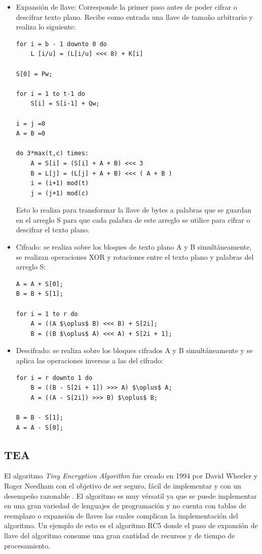 \begin{itemize}
\item Expansión de llave: Corresponde la primer paso antes de poder cifrar o descifrar texto plano. Recibe como entrada una llave de tamaño arbitrario y realiza lo siguiente:
\begin{lstlisting}[caption=Pseudo-código del paso de expansión de llave en el algoritmo RC5 \citep{rivest}., label=lstKeyExpansionRC5, mathescape]
for i = b - 1 downto 0 do
	L [i/u] = (L[i/u] <<< 8) + K[i]
	
S[0] = Pw;

for i = 1 to t-1 do
	S[i] = S[i-1] + Qw;
	
i = j =0
A = B =0

do 3*max(t,c) times:
	A = S[i] = (S[i] + A + B) <<< 3
	B = L[j] = (L[j] + A + B) <<< ( A + B )
	i = (i+1) mod(t)
	j = (j+1) mod(c)
\end{lstlisting}
Esto lo realiza para transformar la llave de bytes a palabras que se guardan en el arreglo S para que cada palabra de este arreglo se utilice para cifrar o descifrar el texto plano.

\item Cifrado: se realiza sobre los bloques de texto plano A y B simultáneamente, se realizan operaciones XOR y rotaciones entre el texto plano y palabras del arreglo S:
\begin{lstlisting}[caption=Pseudo-código del paso de cifrado en el algoritmo RC5 \citep{rivest}., label=lstCipherRC5, mathescape]
A = A + S[0];
B = B + S[1];

for i = 1 to r do
	A = ((A $\oplus$ B) <<< B) + S[2i];
	B = ((B $\oplus$ A) <<< A) + S[2i + 1];
\end{lstlisting}


\item Descifrado: se realiza sobre los bloques cifrados A y B simultáneamente y se aplica las operaciones inversas a las del cifrado:
\begin{lstlisting}[caption=Pseudo-código del paso de descifrado en el algoritmo RC5 \citep{rivest}., label={lstDecipherRC5}, mathescape]
for i = r downto 1 do
	B = ((B - S[2i + 1]) >>> A) $\oplus$ A;
	A = ((A - S[2i]) >>> B) $\oplus$ B;
	
B = B - S[1];
A = A - S[0];
\end{lstlisting}
\end{itemize}




\subsection{TEA}
El algoritmo \textit{Tiny Encryption Algorithm} fue creado en 1994 por David Wheeler y Roger Needham con el objetivo de ser seguro, fácil de implementar y con un desempeño razonable \citep{tea}. El algoritmo es muy vérsatil ya que se puede implementar en una gran variedad de lenguajes de programación y no cuenta con tablas de reemplazo o expansión de llaves las cuales complican la implementación del algoritmo. Un ejemplo de esto es el algoritmo RC5 donde el paso de expansión de llave del algoritmo consume una gran cantidad de recursos y de tiempo de procesamiento.

